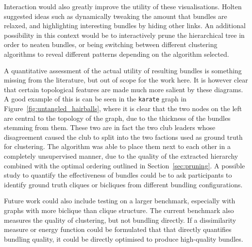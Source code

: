 Interaction would also greatly improve the utility of these visualisations. Holten \cite{Holten2006} suggested ideas such as dynamically tweaking the amount that bundles are relaxed, and highlighting interesting bundles by hiding other links. An additional possibility in this context would be to interactively prune the hierarchical tree in order to neaten bundles, or being switching between different clustering algorithms to reveal different patterns depending on the algorithm selected.

A quantitative assessment of the actual utility of resulting bundles is something missing from the literature, but out of scope for the work here.
It is however clear that certain topological features are made much more salient by these diagrams. A good example of this is can be seen in the \texttt{karate} graph in Figure~\ref{fig:untangled_hairballs}, where it is clear that the two nodes on the left are central to the topology of the graph, due to the thickness of the bundles stemming from them. These two are in fact the two club leaders whose disagreement caused the club to split into the two factions used as ground truth for clustering. The algorithm was able to place them next to each other in a completely unsupervised manner, due to the quality of the extracted hierarchy combined with the optimal ordering \cite{Bar-Joseph2001} outlined in Section~\ref{sec:pruning}.
A possible study to quantify the effectiveness of bundles could be to ask participants to identify ground truth cliques or bicliques from different bundling configurations.

Future work could also include testing on a larger benchmark, especially with graphs with more biclique than clique structure.
The current benchmark also measures the quality of clustering, but not bundling directly. If a dissimilarity measure or energy function could be formulated that that directly quantifies bundling quality, it could be directly optimised to produce high-quality bundles.


